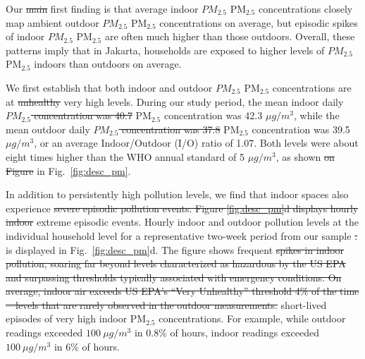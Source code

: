 \documentclass[reqno,12pt,notitlepage]{article}
\providecommand{\DIFadd}[1]{{\protect\color{BLUE}#1}} %
\providecommand{\DIFdel}[1]{{\protect\color{red}\sout{#1}}} %
\providecommand{\DIFaddbegin}{} %
\providecommand{\DIFaddend}{} %
\providecommand{\DIFdelbegin}{} %
\providecommand{\DIFdelend}{} %
\begin{document}
Our \DIFdelbegin \DIFdel{main }\DIFdelend \DIFaddbegin \DIFadd{first }\DIFaddend finding is that average indoor \DIFdelbegin \DIFdel{$PM_{2.5}$ }\DIFdelend \DIFaddbegin \DIFadd{PM$_{2.5}$ }\DIFaddend concentrations closely map ambient outdoor \DIFdelbegin \DIFdel{$PM_{2.5}$ }\DIFdelend \DIFaddbegin \DIFadd{PM$_{2.5}$ }\DIFaddend concentrations on average, but episodic spikes of indoor \DIFdelbegin \DIFdel{$PM_{2.5}$ }\DIFdelend \DIFaddbegin \DIFadd{PM$_{2.5}$ }\DIFaddend are often much higher than those outdoors. Overall, these patterns imply that in Jakarta, households are exposed to higher levels of \DIFdelbegin \DIFdel{$PM_{2.5}$ }\DIFdelend \DIFaddbegin \DIFadd{PM$_{2.5}$ }\DIFaddend indoors than outdoors on average.

We first establish that both indoor and outdoor \DIFdelbegin \DIFdel{$PM_{2.5}$ }\DIFdelend \DIFaddbegin \DIFadd{PM$_{2.5}$ }\DIFaddend concentrations are at \DIFdelbegin \DIFdel{unhealthy }\DIFdelend \DIFaddbegin \DIFadd{very high }\DIFaddend levels. During our study period, the mean indoor daily \DIFdelbegin \DIFdel{$PM_{2.5}$ concentration was 40.7 }\DIFdelend \DIFaddbegin \DIFadd{PM$_{2.5}$ concentration was 42.3 }\DIFaddend $\mu g/m^3$, while the mean outdoor daily \DIFdelbegin \DIFdel{$PM_{2.5}$ concentration was 37.8 }\DIFdelend \DIFaddbegin \DIFadd{PM$_{2.5}$ concentration was 39.5 }\DIFaddend $\mu g/m^3$\DIFaddbegin \DIFadd{, or an average Indoor/Outdoor (I/O) ratio of 1.07}\DIFaddend . Both levels were about eight times higher than the WHO annual standard of 5 $\mu g/m^3$, as shown \DIFdelbegin \DIFdel{on Figure }\DIFdelend \DIFaddbegin \DIFadd{in Fig.\ }\DIFaddend \ref{fig:desc_pm}.

In addition to persistently high pollution levels, we find that indoor spaces also experience \DIFdelbegin \DIFdel{severe episodic pollution events. Figure \ref{fig:desc_pm}d displays hourly indoor }\DIFdelend \DIFaddbegin \DIFadd{extreme episodic events. Hourly indoor and outdoor }\DIFaddend pollution levels at the individual household level for a representative two-week period from our sample \DIFdelbegin \DIFdel{. }\DIFdelend \DIFaddbegin \DIFadd{is displayed in Fig.\ \ref{fig:desc_pm}d. 
}\DIFaddend The figure shows frequent \DIFdelbegin \DIFdel{spikes in indoor pollution, soaring far beyond levels characterized as hazardous by the US EPA and surpassing thresholds typically associated with emergency conditions. On average, indoor air exceeds US EPA's ``Very Unhealthy'' threshold 4\% of the time ---levels that are rarely observed in the outdoor measurements. }\DIFdelend \DIFaddbegin \DIFadd{short-lived episodes of very high indoor PM$_{2.5}$ concentrations. For example, while outdoor readings exceeded $100~\mu g/m^3$ in 0.8\% of hours, indoor readings exceeded $100~\mu g/m^3$ in 6\% of hours. 
}\DIFaddend 
\end{document}
